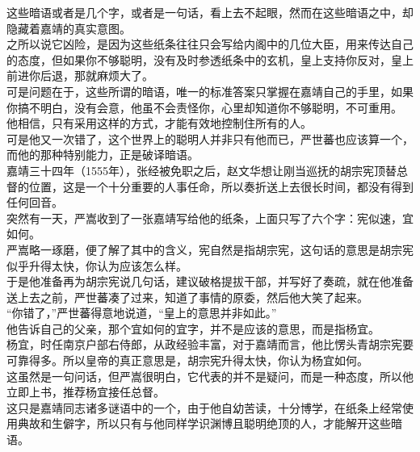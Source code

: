 \begin{multicols}{\theparacolNo}
这些暗语或者是几个字，或者是一句话，看上去不起眼，然而在这些暗语之中，却隐藏着嘉靖的真实意图。\\

之所以说它凶险，是因为这些纸条往往只会写给内阁中的几位大臣，用来传达自己的态度，但如果你不够聪明，没有及时参透纸条中的玄机，皇上支持你反对，皇上前进你后退，那就麻烦大了。\\

可是问题在于，这些所谓的暗语，唯一的标准答案只掌握在嘉靖自己的手里，如果你搞不明白，没有会意，他虽不会责怪你，心里却知道你不够聪明，不可重用。\\

他相信，只有采用这样的方式，才能有效地控制住所有的人。\\

可是他又一次错了，这个世界上的聪明人并非只有他而已，严世蕃也应该算一个，而他的那种特别能力，正是破译暗语。\\

嘉靖三十四年（1555年），张经被免职之后，赵文华想让刚当巡抚的胡宗宪顶替总督的位置，这是一个十分重要的人事任命，所以奏折送上去很长时间，都没有得到任何回音。\\

突然有一天，严嵩收到了一张嘉靖写给他的纸条，上面只写了六个字：宪似速，宜如何。\\

严嵩略一琢磨，便了解了其中的含义，宪自然是指胡宗宪，这句话的意思是胡宗宪似乎升得太快，你认为应该怎么样。\\

于是他准备再为胡宗宪说几句话，建议破格提拔干部，并写好了奏疏，就在他准备送上去之前，严世蕃凑了过来，知道了事情的原委，然后他大笑了起来。\\

“你错了，”严世蕃得意地说道，“皇上的意思并非如此。”\\

他告诉自己的父亲，那个宜如何的宜字，并不是应该的意思，而是指杨宜。\\

杨宜，时任南京户部右侍郎，从政经验丰富，对于嘉靖而言，他比愣头青胡宗宪要可靠得多。所以皇帝的真正意思是，胡宗宪升得太快，你认为杨宜如何。\\

这虽然是一句问话，但严嵩很明白，它代表的并不是疑问，而是一种态度，所以他立即上书，推荐杨宜接任总督。\\

这只是嘉靖同志诸多谜语中的一个，由于他自幼苦读，十分博学，在纸条上经常使用典故和生僻字，所以只有与他同样学识渊博且聪明绝顶的人，才能解开这些暗语。\\


\end{multicols}
